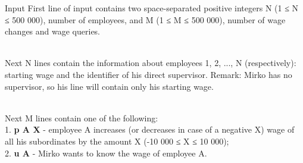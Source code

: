 Input
First line of input contains two space-separated positive integers N (1 ≤ N ≤ 500 000), number of employees, and M (1 ≤ M ≤ 500 000), number of wage changes and wage queries.


\\Next N lines contain the information about employees 1, 2, ..., N (respectively): starting wage and the identifier of his direct supervisor. Remark: Mirko has no supervisor, so his line will contain only his starting wage.


\\Next M lines contain one of the following:
\\1. \textbf{ p A X } - employee A increases (or decreases in case of a negative X) wage of all his subordinates by the amount X (-10 000 ≤ X ≤ 10 000);
\\2. \textbf{ u A } - Mirko wants to know the wage of employee A.
